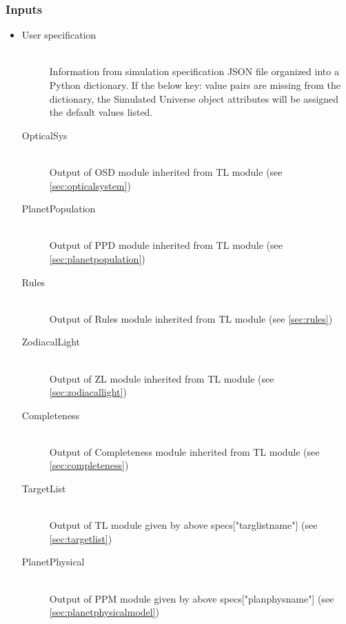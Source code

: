 \documentclass[cleanfoot]{asme2ej}
\begin{document}
\subsubsection*{Inputs}
\begin{itemize}
    \item 
    \begin{description}
        \item[User specification] \hfill \\
        Information from simulation specification JSON file organized into a Python dictionary. If the below key: value pairs are missing from the dictionary, the Simulated Universe object attributes will be assigned the default values listed.
        \item[OpticalSys] \hfill \\
        Output of OSD module inherited from TL module (see \ref{sec:opticalsystem})
        \item[PlanetPopulation] \hfill \\
        Output of PPD module inherited from TL module (see \ref{sec:planetpopulation})
        \item[Rules] \hfill \\
        Output of Rules module inherited from TL module (see \ref{sec:rules})
        \item[ZodiacalLight] \hfill \\
        Output of ZL module inherited from TL module (see \ref{sec:zodiacallight})
        \item[Completeness] \hfill \\
        Output of Completeness module inherited from TL module (see \ref{sec:completeness})
        \item[TargetList] \hfill \\
        Output of TL module given by above specs["targlistname"] (see \ref{sec:targetlist})
        \item[PlanetPhysical] \hfill \\
        Output of PPM module given by above specs["planphysname"] (see \ref{sec:planetphysicalmodel})
    \end{description}
\end{itemize}
\end{document}
